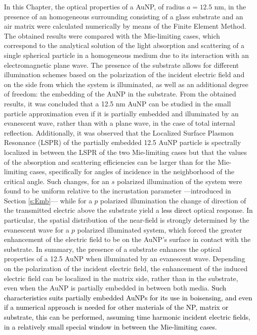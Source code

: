 In this Chapter, the optical properties of a AuNP, of radius $a=12.5$ nm, in the presence of an homogeneous surrounding consisting of a glass substrate and an air matrix were calculated numerically by means of the Finite Element Method. The obtained results were compared with the Mie-limiting cases, which correspond to the analytical solution of the light absorption and scattering of a single spherical particle in a homogeneous medium due to its interaction with an electromagnetic plane wave.  The presence of the substrate allows for different illumination schemes based on the polarization of the incident electric field and on the side from which the system is illuminated, as well as an additional degree of freedom: the embedding of the AuNP in the substrate. From the obtained results, it was concluded that a 12.5 nm AuNP can be studied in the small particle approximation even if it is partially embedded and illuminated by an evanescent wave, rather than with a plane wave, in the case of total internal reflection. Additionally, it was observed that the Localized Surface Plasmon Resonance (LSPR) of the partially embedded 12.5 AuNP particle is spectrally localized in between the LSPR of the two Mie-limiting cases but that the values of the absorption and scattering efficiencies can be larger than for the Mie-limiting cases, specifically for angles of incidence in the neighborhood of the critical angle. Such changes, for an $s$ polarized illumination of the system were found to be uniform relative to the incrustation parameter ---introduced in Section \ref{s:Emb}--- while for a $p$ polarized illumination the change of  direction of the transmitted electric above the substrate yield a \textcolor{black}{less direct} optical response. In particular, the spatial distribution of the near-field is strongly determined by the evanescent wave for a $p$ polarized illuminated system, which forced the greater enhancement of the electric field to be on the AuNP's surface in contact with the substrate. In summary, the presence of a substrate enhances the optical properties of a 12.5 AuNP when illuminated by an evanescent wave. Depending on the polarization of the incident electric field, the enhancement of the induced electric field can be localized in the matrix side, rather than in the substrate, even when the AuNP is partially embedded in between both media. \textcolor{black}{Such characteristics suits partially embedded AuNPs for its use in boisensing, and even if a numerical approach is needed for other materials of the NP, matrix or substrate, this can be performed, assuming time harmonic incident electric fields, in a relatively small special window in between the Mie-limiting cases.}
